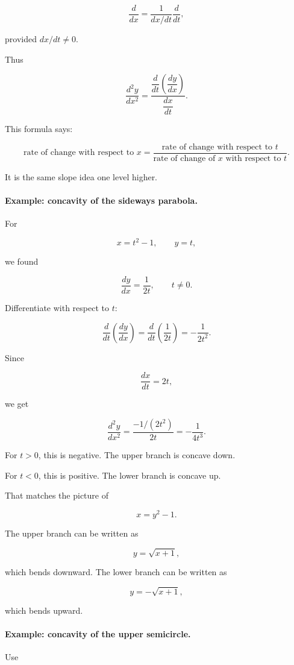 \[
\frac{d}{dx}
=
\frac{1}{dx/dt}\frac{d}{dt},
\]

provided \(dx/dt\neq0\).

Thus

\[
\boxed{
\frac{d^2y}{dx^2}
=
\frac{\dfrac{d}{dt}\left(\dfrac{dy}{dx}\right)}{\dfrac{dx}{dt}}.
}
\]

This formula says:

\[
\text{rate of change with respect to \(x\)}
=
\frac{\text{rate of change with respect to \(t\)}}{\text{rate of change of \(x\) with respect to \(t\)}}.
\]

It is the same slope idea one level higher.

\paragraph{Example: concavity of the sideways parabola.}
For

\[
x=t^2-1,
\qquad
y=t,
\]

we found

\[
\frac{dy}{dx}=\frac{1}{2t},
\qquad
t\neq0.
\]

Differentiate with respect to \(t\):

\[
\frac{d}{dt}\left(\frac{dy}{dx}\right)
=
\frac{d}{dt}\left(\frac{1}{2t}\right)
=
-\frac{1}{2t^2}.
\]

Since

\[
\frac{dx}{dt}=2t,
\]

we get

\[
\frac{d^2y}{dx^2}
=
\frac{-1/(2t^2)}{2t}
=
-\frac{1}{4t^3}.
\]

For \(t>0\), this is negative.  The upper branch is concave down.

For \(t<0\), this is positive.  The lower branch is concave up.

That matches the picture of

\[
x=y^2-1.
\]

The upper branch can be written as

\[
y=\sqrt{x+1},
\]

which bends downward.  The lower branch can be written as

\[
y=-\sqrt{x+1},
\]

which bends upward.

\paragraph{Example: concavity of the upper semicircle.}
Use

